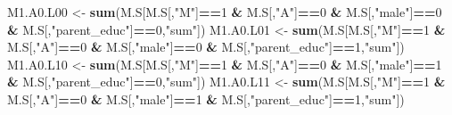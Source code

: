 \documentclass[
]{book}
\newenvironment{Shaded}{\begin{snugshade}}{\end{snugshade}}
\newcommand{\DecValTok}[1]{\textcolor[rgb]{0.00,0.00,0.81}{#1}}
\newcommand{\FunctionTok}[1]{\textcolor[rgb]{0.13,0.29,0.53}{\textbf{#1}}}
\newcommand{\NormalTok}[1]{#1}
\newcommand{\OtherTok}[1]{\textcolor[rgb]{0.56,0.35,0.01}{#1}}
\newcommand{\SpecialCharTok}[1]{\textcolor[rgb]{0.81,0.36,0.00}{\textbf{#1}}}
\newcommand{\StringTok}[1]{\textcolor[rgb]{0.31,0.60,0.02}{#1}}
\begin{document}
\begin{Shaded}
\begin{Highlighting}[]
\NormalTok{  M1.A0.L00 }\OtherTok{\textless{}{-}} \FunctionTok{sum}\NormalTok{(M.S[M.S[,}\StringTok{"M"}\NormalTok{]}\SpecialCharTok{==}\DecValTok{1} \SpecialCharTok{\&}\NormalTok{ M.S[,}\StringTok{"A"}\NormalTok{]}\SpecialCharTok{==}\DecValTok{0} \SpecialCharTok{\&}\NormalTok{ M.S[,}\StringTok{"male"}\NormalTok{]}\SpecialCharTok{==}\DecValTok{0} \SpecialCharTok{\&} 
\NormalTok{                         M.S[,}\StringTok{"parent\_educ"}\NormalTok{]}\SpecialCharTok{==}\DecValTok{0}\NormalTok{,}\StringTok{"sum"}\NormalTok{])}
\NormalTok{  M1.A0.L01 }\OtherTok{\textless{}{-}} \FunctionTok{sum}\NormalTok{(M.S[M.S[,}\StringTok{"M"}\NormalTok{]}\SpecialCharTok{==}\DecValTok{1} \SpecialCharTok{\&}\NormalTok{ M.S[,}\StringTok{"A"}\NormalTok{]}\SpecialCharTok{==}\DecValTok{0} \SpecialCharTok{\&}\NormalTok{ M.S[,}\StringTok{"male"}\NormalTok{]}\SpecialCharTok{==}\DecValTok{0} \SpecialCharTok{\&} 
\NormalTok{                         M.S[,}\StringTok{"parent\_educ"}\NormalTok{]}\SpecialCharTok{==}\DecValTok{1}\NormalTok{,}\StringTok{"sum"}\NormalTok{])}
\NormalTok{  M1.A0.L10 }\OtherTok{\textless{}{-}} \FunctionTok{sum}\NormalTok{(M.S[M.S[,}\StringTok{"M"}\NormalTok{]}\SpecialCharTok{==}\DecValTok{1} \SpecialCharTok{\&}\NormalTok{ M.S[,}\StringTok{"A"}\NormalTok{]}\SpecialCharTok{==}\DecValTok{0} \SpecialCharTok{\&}\NormalTok{ M.S[,}\StringTok{"male"}\NormalTok{]}\SpecialCharTok{==}\DecValTok{1} \SpecialCharTok{\&} 
\NormalTok{                         M.S[,}\StringTok{"parent\_educ"}\NormalTok{]}\SpecialCharTok{==}\DecValTok{0}\NormalTok{,}\StringTok{"sum"}\NormalTok{])}
\NormalTok{  M1.A0.L11 }\OtherTok{\textless{}{-}} \FunctionTok{sum}\NormalTok{(M.S[M.S[,}\StringTok{"M"}\NormalTok{]}\SpecialCharTok{==}\DecValTok{1} \SpecialCharTok{\&}\NormalTok{ M.S[,}\StringTok{"A"}\NormalTok{]}\SpecialCharTok{==}\DecValTok{0} \SpecialCharTok{\&}\NormalTok{ M.S[,}\StringTok{"male"}\NormalTok{]}\SpecialCharTok{==}\DecValTok{1} \SpecialCharTok{\&} 
\NormalTok{                         M.S[,}\StringTok{"parent\_educ"}\NormalTok{]}\SpecialCharTok{==}\DecValTok{1}\NormalTok{,}\StringTok{"sum"}\NormalTok{])}


\end{Highlighting}
\end{Shaded}
\end{document}
